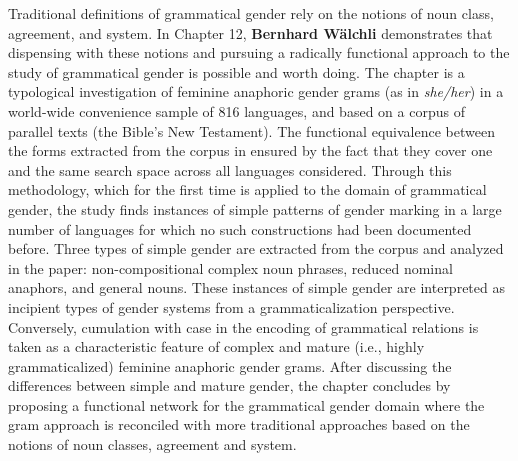 \documentclass[output=collectionpaper]{langsci/langscibook}
\begin{document}
Traditional definitions of grammatical gender rely on the notions of noun class, agreement, and system. In Chapter 12, \textbf{Bernhard Wälchli} demonstrates that dispensing with these notions and pursuing a radically functional approach to the study of grammatical gender is possible and worth doing. The chapter is a typological investigation of feminine anaphoric gender grams (as in  \textit{she/her}) in a world-wide convenience sample of 816 languages, and based on a corpus of parallel texts (the Bible’s New Testament). The functional equivalence between the forms extracted from the corpus in ensured by the fact that they cover one and the same search space across all languages considered. Through this methodology, which for the first time is applied to the domain of grammatical gender, the study finds instances of simple patterns of gender marking in a large number of languages for which no such constructions had been documented before. Three types of simple gender are extracted from the corpus and analyzed in the paper: non-compositional complex noun phrases, reduced nominal anaphors, and general nouns. These instances of simple gender are interpreted as incipient types of gender systems from a grammaticalization perspective. Conversely, cumulation with case in the encoding of grammatical relations is taken as a characteristic feature of complex and mature (i.e., highly grammaticalized) feminine anaphoric gender grams. After discussing the differences between simple and mature gender, the chapter concludes by proposing a functional network for the grammatical gender domain where the gram approach is reconciled with more traditional approaches based on the notions of noun classes, agreement and system.
\end{document}
